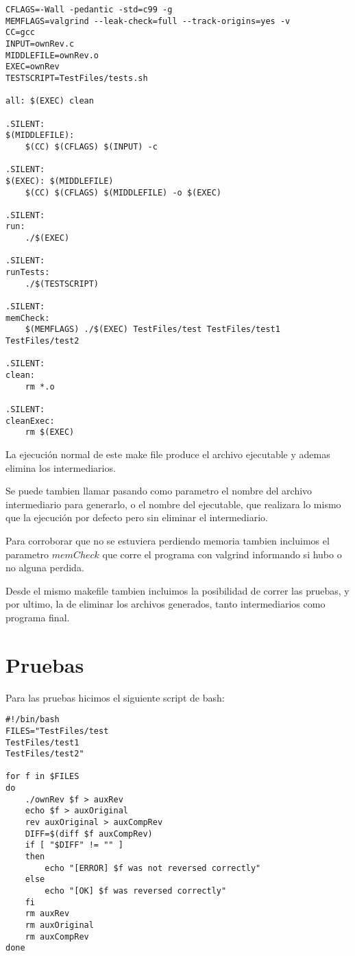 \documentclass{article}
\begin{document}
\begin{verbatim}
CFLAGS=-Wall -pedantic -std=c99 -g
MEMFLAGS=valgrind --leak-check=full --track-origins=yes -v
CC=gcc
INPUT=ownRev.c
MIDDLEFILE=ownRev.o
EXEC=ownRev
TESTSCRIPT=TestFiles/tests.sh

all: $(EXEC) clean

.SILENT:
$(MIDDLEFILE):
	$(CC) $(CFLAGS) $(INPUT) -c

.SILENT:
$(EXEC): $(MIDDLEFILE)
	$(CC) $(CFLAGS) $(MIDDLEFILE) -o $(EXEC)

.SILENT:	
run:
	./$(EXEC)

.SILENT:
runTests:
	./$(TESTSCRIPT)

.SILENT:
memCheck:
	$(MEMFLAGS) ./$(EXEC) TestFiles/test TestFiles/test1 TestFiles/test2

.SILENT:
clean:
	rm *.o

.SILENT:
cleanExec:
	rm $(EXEC)

\end{verbatim}

La ejecución normal de este make file produce el archivo ejecutable y ademas elimina los intermediarios.

Se puede tambien llamar pasando como parametro el nombre del archivo intermediario para generarlo, o el nombre del ejecutable, que realizara lo mismo que la ejecución por defecto pero sin eliminar el intermediario.

Para corroborar que no se estuviera perdiendo memoria tambien incluimos el parametro \(memCheck\) que corre el programa con valgrind informando si hubo o no alguna perdida.

Desde el mismo makefile tambien incluimos la posibilidad de correr las pruebas, y por ultimo, la de eliminar los archivos generados, tanto intermediarios como programa final.

\section{Pruebas}

Para las pruebas hicimos el siguiente script de bash:

\begin{verbatim}
#!/bin/bash
FILES="TestFiles/test
TestFiles/test1
TestFiles/test2"

for f in $FILES
do
	./ownRev $f > auxRev
	echo $f > auxOriginal
	rev auxOriginal > auxCompRev
	DIFF=$(diff $f auxCompRev)
	if [ "$DIFF" != "" ] 
	then
		echo "[ERROR] $f was not reversed correctly"
	else
		echo "[OK] $f was reversed correctly"
	fi
	rm auxRev
	rm auxOriginal
	rm auxCompRev
done
\end{verbatim}
\end{document}

